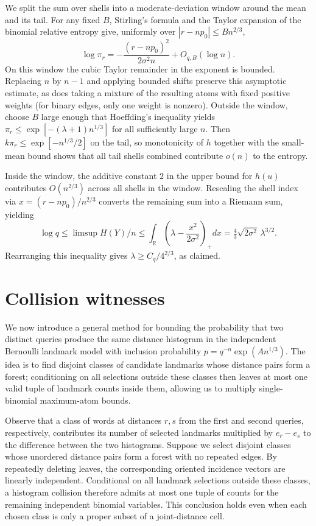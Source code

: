 We split the sum over shells into a moderate-deviation window around the mean and its tail. For any fixed $B$, Stirling's formula and the Taylor expansion of the binomial relative entropy give, uniformly over $|r-np_0|\le Bn^{2/3}$,
\[
 \log\pi_r=-\frac{(r-np_0)^2}{2\sigma^2n}+O_{q,B}(\log n).
\]
On this window the cubic Taylor remainder in the exponent is bounded. Replacing $n$ by $n-1$ and applying bounded shifts preserve this asymptotic estimate, as does taking a mixture of the resulting atoms with fixed positive weights (for binary edges, only one weight is nonzero). Outside the window, choose $B$ large enough that Hoeffding's inequality yields $\pi_r\le\exp[-(\lambda+1)n^{1/3}]$ for all sufficiently large $n$. Then $k\pi_r\le\exp[-n^{1/3}/2]$ on the tail, so monotonicity of $h$ together with the small-mean bound shows that all tail shells combined contribute $o(n)$ to the entropy.

Inside the window, the additive constant $2$ in the upper bound for $h(u)$ contributes $O(n^{2/3})$ across all shells in the window. Rescaling the shell index via $x=(r-np_0)/n^{2/3}$ converts the remaining sum into a Riemann sum, yielding
\[
 \log q\le\limsup H(Y)/n\le
 \int_{\mathbb R}\!\left(\lambda-\frac{x^2}{2\sigma^2}\right)_+dx
 =\tfrac43\sqrt{2\sigma^2}\,\lambda^{3/2}.
\]
Rearranging this inequality gives $\lambda\ge C_q/4^{2/3}$, as claimed.

\section{Collision witnesses}
We now introduce a general method for bounding the probability that two distinct queries produce the same distance histogram in the independent Bernoulli landmark model with inclusion probability $p=q^{-n}\exp(A n^{1/3})$. The idea is to find disjoint classes of candidate landmarks whose distance pairs form a forest; conditioning on all selections outside these classes then leaves at most one valid tuple of landmark counts inside them, allowing us to multiply single-binomial maximum-atom bounds.

Observe that a class of words at distances $r,s$ from the first and second queries, respectively, contributes its number of selected landmarks multiplied by $e_r-e_s$ to the difference between the two histograms. Suppose we select disjoint classes whose unordered distance pairs form a forest with no repeated edges. By repeatedly deleting leaves, the corresponding oriented incidence vectors are linearly independent. Conditional on all landmark selections outside these classes, a histogram collision therefore admits at most one tuple of counts for the remaining independent binomial variables. This conclusion holds even when each chosen class is only a proper subset of a joint-distance cell.

